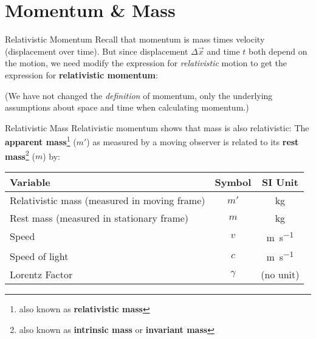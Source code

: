 \documentclass[12pt,compress,aspectratio=169]{beamer}
\newcommand{\bigsqrt}{\ensuremath\sqrt{1-\left(\dfrac vc\right)^2}}
\begin{document}
%
%



\section{Momentum \& Mass}

\begin{frame}{Relativistic Momentum}
  Recall that momentum is mass times velocity (displacement over time). But
  since displacement $\Delta\vec x$ and time $t$ both depend on the motion, we
  need modify the expression for \emph{relativistic} motion to get the
  expression for \textbf{relativistic momentum}:
 
  \eq{-.1in}{
    \boxed{
      p=\frac{m\vec v}\bigsqrt
    }
  }
  
  (We have not changed the \emph{definition} of momentum, only the underlying
  assumptions about space and time when calculating momentum.)
\end{frame}




\begin{frame}{Relativistic Mass}
  Relativistic momentum shows that mass is also relativistic:
  The \textbf{apparent mass}\footnote{also known as \textbf{relativistic mass}}
  ($m'$) as measured by a moving observer is related to its
  \textbf{rest mass}\footnote{also known as \textbf{intrinsic mass} or
    \textbf{invariant mass}} ($m$) by:

  \eq{-.13in}{
    \boxed{m'=\frac m\bigsqrt=\gamma m}
  }
  \begin{center}
    \begin{tabular}{l|c|c}
      \rowcolor{pink}
      \textbf{Variable} & \textbf{Symbol} & \textbf{SI Unit}\\ \hline
      Relativistic mass (measured in moving frame) & $m'$ & \si{\kilo\gram}\\
      Rest mass (measured in stationary frame) & $m$  & \si{\kilo\gram}\\
      Speed               & $v$ & \si{\metre\per\second}\\
      Speed of light      & $c$ & \si{\metre\per\second}\\
      Lorentz Factor      & $\gamma$ & (no unit)
    \end{tabular}
  \end{center}
\end{frame}
\end{document}
